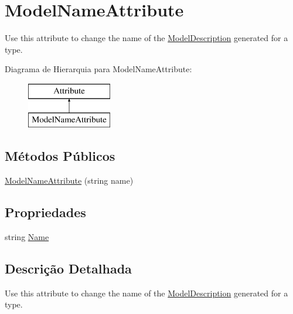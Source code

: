 \hypertarget{classApi3Layers_1_1Areas_1_1HelpPage_1_1ModelDescriptions_1_1ModelNameAttribute}{}\section{Model\+Name\+Attribute}
\label{classApi3Layers_1_1Areas_1_1HelpPage_1_1ModelDescriptions_1_1ModelNameAttribute}


Use this attribute to change the name of the \hyperlink{classApi3Layers_1_1Areas_1_1HelpPage_1_1ModelDescriptions_1_1ModelDescription}{Model\+Description} generated for a type.  


Diagrama de Hierarquia para Model\+Name\+Attribute\+:\begin{figure}[H]
\begin{center}
\leavevmode
\includegraphics[height=2.000000cm]{classApi3Layers_1_1Areas_1_1HelpPage_1_1ModelDescriptions_1_1ModelNameAttribute}
\end{center}
\end{figure}
\subsection*{Métodos Públicos}
\begin{DoxyCompactItemize}
\item 
\hyperlink{classApi3Layers_1_1Areas_1_1HelpPage_1_1ModelDescriptions_1_1ModelNameAttribute_a0e5f4a1f1b6fb75cb7804f6905744f39}{Model\+Name\+Attribute} (string name)
\end{DoxyCompactItemize}
\subsection*{Propriedades}
\begin{DoxyCompactItemize}
\item 
string \hyperlink{classApi3Layers_1_1Areas_1_1HelpPage_1_1ModelDescriptions_1_1ModelNameAttribute_a7ee9065718e6628dc7791b756fa6c0f9}{Name}
\end{DoxyCompactItemize}


\subsection{Descrição Detalhada}
Use this attribute to change the name of the \hyperlink{classApi3Layers_1_1Areas_1_1HelpPage_1_1ModelDescriptions_1_1ModelDescription}{Model\+Description} generated for a type. 



